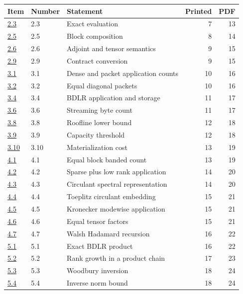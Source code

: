 {\small\begin{longtable}{@{}p{.10\linewidth}p{.11\linewidth}p{.51\linewidth}rr@{}}\toprule Item & Number & Statement & Printed & PDF\\\midrule\endhead
\hyperref[result:2.3]{2.3} & 2.3 & Exact evaluation & 7 & 13\\
\hyperref[result:2.5]{2.5} & 2.5 & Block composition & 8 & 14\\
\hyperref[result:2.6]{2.6} & 2.6 & Adjoint and tensor semantics & 9 & 15\\
\hyperref[result:2.9]{2.9} & 2.9 & Contract conversion & 9 & 15\\
\hyperref[result:3.1]{3.1} & 3.1 & Dense and packet application counts & 10 & 16\\
\hyperref[result:3.2]{3.2} & 3.2 & Equal diagonal packets & 10 & 16\\
\hyperref[result:3.4]{3.4} & 3.4 & BDLR application and storage & 11 & 17\\
\hyperref[result:3.6]{3.6} & 3.6 & Streaming byte count & 11 & 17\\
\hyperref[result:3.8]{3.8} & 3.8 & Roofline lower bound & 12 & 18\\
\hyperref[result:3.9]{3.9} & 3.9 & Capacity threshold & 12 & 18\\
\hyperref[result:3.10]{3.10} & 3.10 & Materialization cost & 13 & 19\\
\hyperref[result:4.1]{4.1} & 4.1 & Equal block banded count & 13 & 19\\
\hyperref[result:4.2]{4.2} & 4.2 & Sparse plus low rank application & 14 & 20\\
\hyperref[result:4.3]{4.3} & 4.3 & Circulant spectral representation & 14 & 20\\
\hyperref[result:4.4]{4.4} & 4.4 & Toeplitz circulant embedding & 15 & 21\\
\hyperref[result:4.5]{4.5} & 4.5 & Kronecker modewise application & 15 & 21\\
\hyperref[result:4.6]{4.6} & 4.6 & Equal tensor factors & 15 & 21\\
\hyperref[result:4.7]{4.7} & 4.7 & Walsh Hadamard recursion & 16 & 22\\
\hyperref[result:5.1]{5.1} & 5.1 & Exact BDLR product & 16 & 22\\
\hyperref[result:5.2]{5.2} & 5.2 & Rank growth in a product chain & 17 & 23\\
\hyperref[result:5.3]{5.3} & 5.3 & Woodbury inversion & 18 & 24\\
\hyperref[result:5.4]{5.4} & 5.4 & Inverse norm bound & 18 & 24\\

\end{longtable}}
